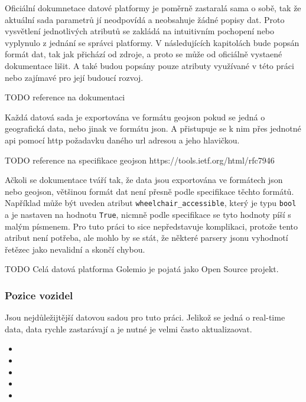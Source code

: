 \bigbreak

Oficiální dokumnetace datové platformy je poměrně zastaralá sama o sobě, tak že aktuální sada parametrů jí neodpovídá a neobsahuje žádné popisy dat. Proto vysvětlení jednotlivých atributů se zakládá na intuitivním pochopení nebo vyplynulo z jednání se správci platformy. V následujících kapitolách bude popsán formát dat, tak jak přichází od zdroje, a proto se může od oficiálně vystaené dokumentace lišit. A také budou popsány pouze atributy využívané v této práci nebo zajímavé pro její budoucí rozvoj.

TODO reference na dokumentaci

\bigbreak

Každá datová sada je exportována ve formátu \gls{geojson} pokud se jedná o geografická data, nebo jinak ve formátu \gls{json}. A přistupuje se k nim přes jednotné \gls{api} pomocí \gls{http} požadavku daného \gls{url} adresou a jeho hlavičkou.

TODO reference na specifikace geojson https://tools.ietf.org/html/rfc7946

\bigbreak

Ačkoli se dokumentace tváří tak, že data jsou exportována ve formátech \gls{json} nebo \gls{geojson}, většinou formát dat není přesně podle specifikace těchto formátů. Například může být uveden atribut \verb"wheelchair_accessible", který je typu \verb"bool" a je nastaven na hodnotu \verb"True", nicmně podle specifikace se tyto hodnoty píší s malým písmenem. Pro tuto práci to sice nepředstavuje komplikaci, protože tento atribut není potřeba, ale mohlo by se stát, že některé parsery \gls{json}u vyhodnotí řetězec jako nevalidní a skončí chybou.

\bigbreak

TODO Celá datová platforma Golemio je pojatá jako Open Source projekt.

\subsubsection{Pozice vozidel}

Jsou nejdůležijtější datovou sadou pro tuto práci. Jelikož se jedná o real-time data, data rychle zastarávají a je nutné je velmi často aktualizaovat.

\begin{itemize}
	\item {}

	\item {}

	\item {}

	\item {}

	\item {}
\end{itemize}

